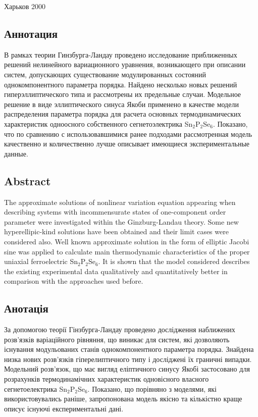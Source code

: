 \begin{center}
  Харьков 2000
\end{center}
\subsection{Аннотация}
В рамках теории Гинзбурга-Ландау проведено исследование приближенных решений нелинейного вариационного уравнения, возникающего при описании систем, допускающих существование модулированных состояний однокомпонентного параметра порядка.
Найдено несколько новых решений гиперэллиптического типа и рассмотрены их предельные случаи.
Модельное решение в виде эллиптического синуса Якоби применено в качестве модели распределения параметра порядка для расчета основных термодинамических характеристик одноосного собственного сегнетоэлектрика Sn$_2$P$_2$Se$_6$.
Показано, что по сравнению с использовавшимися ранее подходами рассмотренная модель качественно и количественно лучше описывает имеющиеся экспериментальные данные.

\subsection{Abstract}
The approximate solutions of nonlinear variation equation appearing when describing systems with incommensurate states of one-component order parameter were investigated within the Ginzburg-Landau theory.
Some new hyperellipic-kind solutions have been obtained and their limit cases were considered also.
Well known approximate solution in the form of elliptic Jacobi sine was applied to calculate main thermodynamic characteristics of the proper uniaxial ferroelectric Sn$_2$P$_2$Se$_6$.
It is shown that the model considered describes the existing experimental data qualitatively and quantitatively better in comparison with the approaches used before. 
\subsection{Анотація}
За допомогою теорії Гінзбурга-Ландау проведено дослідження наближених розв’язків варіаційного рівняння, що виникає для систем, які дозволяють існування модульованих станів однокомпонентного параметра порядка.
Знайдена низка нових розв’язків гіперелиптичного типу і досліджені їх граничні випадки.
Модельний розв’язок, що має вигляд еліптичного синусу Якобі застосовано для розрахунків термодинамічних характеристик одновісного власного сегнетоелектрика Sn$_2$P$_2$Se$_6$.
Показано, що порівняно з моделями, які використовувались раніше, запропонована модель якісно та кількістно краще описує існуючі експериментальні дані.
